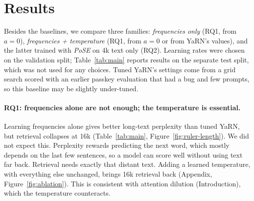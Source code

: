 
\graphicspath{{../../Documentation/figures/results/}{../../Documentation/figures/rq1_temp/}{../figures/results/}{../figures/rq1_temp/}{../../figures/results/}{../../figures/rq1_temp/}}

\section{Results}
\label{sec:results}

Besides the baselines, we compare three families:
\emph{frequencies only} (RQ1, from $a{=}0$),
\emph{frequencies + temperature} (RQ1, from $a{=}0$ or from YaRN's values), and
the latter trained with \emph{PoSE} on 4k text only (RQ2).
Learning rates were chosen on the validation split; Table~\ref{tab:main} reports results on the separate test split, which was not used for any choices.
Tuned YaRN's settings come from a grid search scored with an earlier passkey
evaluation that had a bug and few prompts, so this baseline may be slightly
under-tuned.

\paragraph{RQ1: frequencies alone are not enough; the temperature is essential.}
Learning frequencies alone gives better long-text perplexity than tuned
YaRN, but retrieval collapses at 16k (Table~\ref{tab:main},
Figure~\ref{fig:ruler-length}).
We did not expect this. Perplexity rewards predicting the next word, which
mostly depends on the last few sentences, so a model can score well without
using text far back. Retrieval needs exactly that distant text.
Adding a learned temperature, with everything else unchanged, brings 16k
retrieval back (Appendix, Figure~\ref{fig:ablation}).
This is consistent with attention dilution (Introduction), which the
temperature counteracts.

